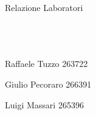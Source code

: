 \begin{titlepage}
	{ \Huge \textsf{Relazione Laboratori}}\\[0.7 cm] %
\\
\\
\\
\begin{flushright}
	Raffaele Tuzzo 263722
\end{flushright}
\begin{flushright}
	Giulio Pecoraro	266391
\end{flushright}
\begin{flushright}
	Luigi Massari	265396
\end{flushright}


	
	\vfill %
	\thispagestyle{empty}
\end{titlepage}